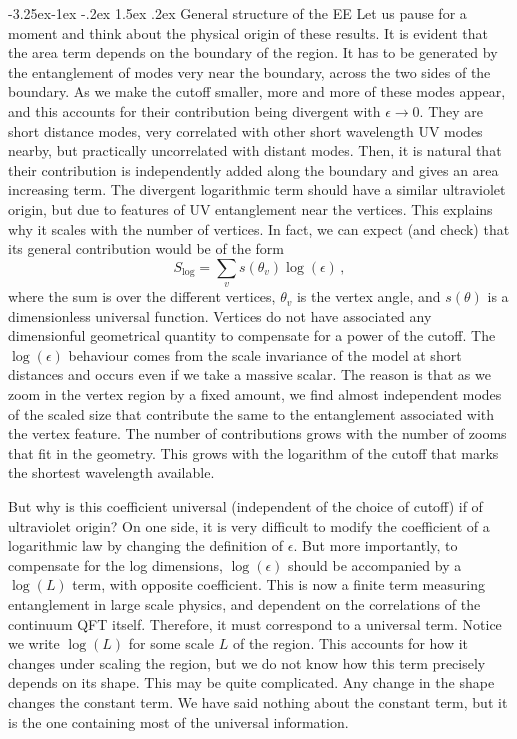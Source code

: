 \documentclass[11pt,a4paper]{article}
\makeatletter
\renewcommand\subsection{\@startsection{subsection}{2}{\z@}%
                                   {-3.25ex\@plus -1ex \@minus -.2ex}%
                                     {1.5ex \@plus .2ex}%
                                     {\normalfont\bfseries}}
\numberwithin{equation}{section}
\newcommand{\be}{\begin{equation}}
\newcommand{\ee}{\end{equation}}
\makeatother
\begin{document}
\subsection{General structure of the EE}
\label{ge}
Let us pause for a moment and think about the physical origin of these results. It is evident that the area term depends on the boundary of the region. It has to be generated by the entanglement of modes very near the boundary, across the two sides of the boundary. As we make the cutoff smaller, more and more of these modes appear, and this accounts for their contribution being divergent with $\epsilon\rightarrow 0$. They are short distance modes, very correlated with other short wavelength UV modes nearby, but practically uncorrelated with distant modes. Then, it is natural that their contribution is independently added along the boundary and gives an area increasing term. The divergent logarithmic term should have a similar ultraviolet origin, but due to features of UV entanglement near the vertices. 
This explains why it scales with the number of vertices. In fact, we can expect (and check) that its general contribution would be of the form
\be
S_{\log}=\sum_{v} s(\theta_v) \log(\epsilon)\,,
\ee
where the sum is over the different vertices, $\theta_v$ is the vertex angle, and $s(\theta)$ is a dimensionless universal function. Vertices do not have associated any dimensionful geometrical quantity to compensate for a power of the cutoff.  The $\log(\epsilon)$ behaviour comes from the scale invariance of the model at short distances and occurs even if we take a massive scalar. The reason is that as we zoom in the vertex region by a fixed amount, we find almost independent modes of the scaled size that contribute the same to the entanglement associated with the vertex feature. The number of contributions grows with the number of zooms that fit in the geometry. This grows with the logarithm of the cutoff that marks the shortest wavelength available.  

 But why is this coefficient universal (independent of the choice of cutoff) if of ultraviolet origin? On one side, it is very difficult to modify the coefficient of a logarithmic law by changing the definition of $\epsilon$. But more importantly, to compensate for the log dimensions, $\log(\epsilon)$ should be accompanied by a $\log(L)$ term,  with opposite coefficient. This is now a finite term measuring entanglement in large scale physics, and dependent on the correlations of the continuum QFT itself. Therefore, it must correspond to a universal term. Notice we write $\log(L)$ for some scale $L$ of the region. This accounts for how it changes under scaling the region,  but we do not know how this term precisely depends on its shape. This may be quite complicated. Any change in the shape changes the constant term. We have said nothing about the constant term, but it is the one containing most of the universal information.       
\end{document}
